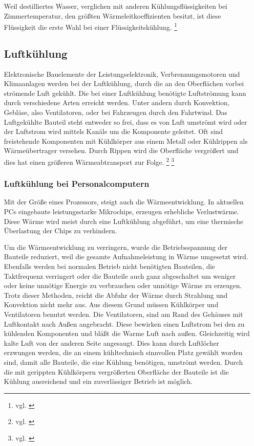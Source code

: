 Weil destilliertes Wasser, verglichen mit anderen Kühlungsflüssigkeiten bei Zimmertemperatur, den größten Wärmeleitkoeffizienten besitzt, ist diese Flüssigkeit die erste Wahl bei einer Flüssigkeitskühlung. \footnote{vgl. \cite{Wasserkuehlung}}

\newpage

\subsection{Luftkühlung} 

Elektronische Bauelemente der Leistungselektronik, Verbrennungsmotoren und Klimaanlagen werden bei der Luftkühlung, durch die an den Oberflächen vorbei strömende Luft gekühlt.
Die bei einer Luftkühlung benötigte Luftströmung kann durch verschiedene Arten erreicht werden. Unter andern durch Konvektion, Gebläse, also Ventilatoren, oder bei Fahrzeugen durch den Fahrtwind. 
Das Luftgekühlte Bauteil steht entweder so frei, dass es von Luft umströmt wird oder der Luftstrom wird mittels Kanäle um die Komponente geleitet. Oft sind freistehende Komponenten mit Kühlkörper aus einem Metall oder Kühlrippen als Wärmeübertrager versehen. Durch Rippen wird die Oberfläche vergrößert und dies hat einen größeren Wärmeabtransport zur Folge. \footnote{vgl. \cite{Luftkuehlung1}} \footnote{vgl. \cite{Luftkuehlung2}}

\subsubsection{Luftkühlung bei Personalcomputern}

Mit der Größe eines Prozessors, steigt auch die Wärmeentwicklung. In aktuellen PCs eingebaute leistungsstarke Mikrochips, erzeugen erhebliche Verlustwärme. Diese Wärme wird meist durch eine Luftkühlung abgeführt, um eine thermische Überlastung der Chips zu verhindern.

Um die Wärmeentwicklung zu verringern, wurde die Betriebsspannung der Bauteile reduziert, weil die gesamte Aufnahmeleistung in Wärme umgesetzt wird. Ebenfalls werden bei normalen Betrieb nicht benötigten Bauteilen, die Taktfrequenz verringert oder die Bauteile auch ganz abgeschaltet um weniger oder keine unnötige Energie zu verbrauchen oder unnötige Wärme zu erzeugen. Trotz dieser Methoden, reicht die Abfuhr der Wärme durch Strahlung und Konvektion nicht mehr aus.
Aus diesem Grund müssen Kühlkörper und Ventilatoren benutzt werden. Die Ventilatoren, sind am Rand des Gehäuses mit Luftkontakt nach Außen angebracht. Diese bewirken einen Luftstrom bei den zu kühlenden Komponenten und bläßt die Warme Luft nach außen. Gleichzeitig wird kalte Luft von der anderen Seite angesaugt. Dies kann durch Luftlöcher erzwungen werden, die an einem kühltechnisch sinnvollen Platz gewählt worden sind, damit alle Bauteile, die eine Kühlung benötigen, umströmt werden.
Durch die mit gerippten Kühlkörpern vergrößerten Oberfläche der Bauteile ist die Kühlung ausreichend und ein zuverlässiger Betrieb ist möglich. 

